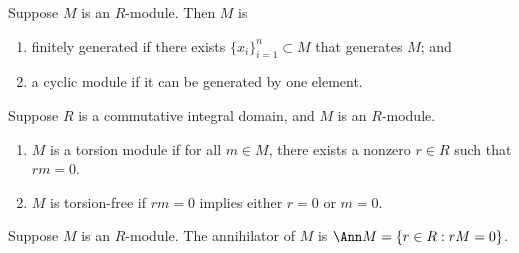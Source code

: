 \begin{definition}
    Suppose \(M\) is an \(R\)-module. Then \(M\) is 
    \begin{enumerate}[label={(\roman*)}, itemsep=0mm]
        \item finitely generated if there exists \({\{x_i\}}_{i=1}^n \subset M\) that generates \(M\); and
        \item a cyclic module if it can be generated by one element.
    \end{enumerate}
\end{definition}
\begin{definition}
    Suppose \(R\) is a commutative integral domain,
    and \(M\) is an \(R\)-module.
    \begin{enumerate}[label={(\roman*)}, itemsep=0mm]
        \item \(M\) is a torsion module if for all \(m \in M\),
            there exists a nonzero \(r \in R\) such that \(rm = 0\).
        \item \(M\) is torsion-free if \(rm = 0\) implies either \(r = 0\) or \(m = 0\).
    \end{enumerate}
\end{definition}
\begin{definition}
    Suppose \(M\) is an \(R\)-module.
    The annihilator of \(M\) is \(\Ann M = \{r \in R: rM = 0\}\).
\end{definition}
